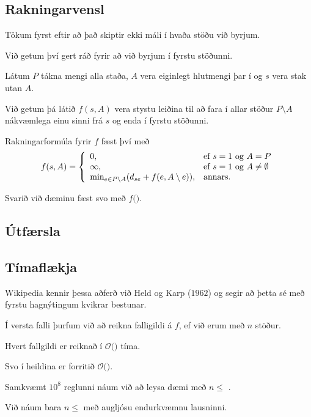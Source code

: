 \subsection{Rakningarvensl}
{
    {
        \item<1-> Tökum fyrst eftir að það skiptir ekki máli í hvaða stöðu við byrjum.
        \item<2-> Við getum því gert ráð fyrir að við byrjum í fyrstu stöðunni.
        \item<3-> Látum $P$ tákna mengi alla staða, $A$ vera eiginlegt hlutmengi þar í og $s$ vera stak utan $A$.
        \item<4-> Við getum þá látið $f(s, A)$ vera stystu leiðina til að fara í allar stöður $P \setminus A$ nákvæmlega einu sinni frá $s$
            og enda í fyrstu stöðunni.
        \item<5-> Rakningarformúla fyrir $f$ fæst því með
        \[
            f(s, A) = 
            \left \{
            \env{array}
            {
                {l l}
                0, & \text{ef $s = 1$ og $A = P$}\\
                \infty, & \text{ef $s = 1$ og $A \neq \emptyset$}\\
                \text{min}_{e \in P \setminus A} (d_{se} + f(e, A \setminus e)), & \text{annars}.
            }
            \right .
        \]
        \item<6-> Svarið við dæminu fæst svo með $f($$)$.
    }
}

\subsection{Útfærsla}
{
}

\subsection{Tímaflækja}
{
    {
        \item<1-> Wikipedia kennir þessa aðferð við Held og Karp ($1962$) og segir að þetta sé með fyrstu hagnýtingum kvikrar bestunar.
        \item<2-> Í versta falli þurfum við að reikna  falligildi á $f$, ef við erum með $n$ stöður.
        \item<4-> Hvert fallgildi er reiknað í $\mathcal{O}($$)$ tíma.
        \item<6-> Svo í heildina er forritið $\mathcal{O}($$)$.
        \item<8-> Samkvæmt $10^8$ reglunni náum við að leysa dæmi með $n \leq$ .
        \item<10-> Við náum bara $n \leq$  með augljósu endurkvæmnu lausninni.
    }
}

